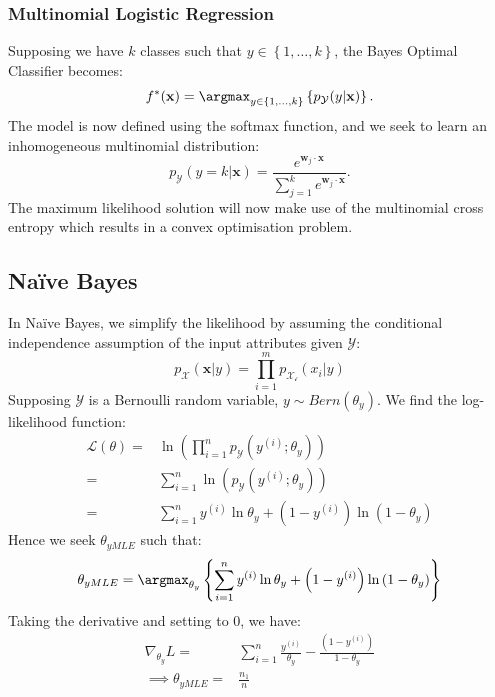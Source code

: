\subsubsection{Multinomial Logistic Regression}
Supposing we have $k$ classes such that $y\in \left\{ 1,\ldots,k \right\}$, the Bayes
Optimal Classifier becomes:
\[f^{*}(\mathbf{x})=\argmax_{y\in \left\{ 1,\ldots,k \right\}}\left\{ p_\mathcal{Y}(y|\mathbf{x}) \right\}.\] 
The model is now defined using the softmax function, and we seek to learn an
inhomogeneous multinomial distribution:
\[p_\mathcal{Y}(y=k|\mathbf{x})=\frac{e^{\mathbf{w}_j\cdot \mathbf{x}}}{\sum_{j=1}^{k} e^{\mathbf{w}_j\cdot\mathbf{x}}}.\] 
The maximum likelihood solution will now make use of the multinomial cross
entropy which results in a convex optimisation problem.

\subsection{Naïve Bayes}
In Naïve Bayes, we simplify the likelihood by assuming the conditional
independence assumption of the input attributes given $\mathcal{Y}$:
\[p_\mathcal{X}(\mathbf{x}|y)=\prod_{i=1}^{m} p_\mathcal{X_i} (x_i|y)\] 
Supposing $\mathcal{Y}$ is a Bernoulli random variable,
$y\sim Bern(\theta_y)$. We find the log-likelihood function:
\begin{align*}
\mathcal{L}\left( \theta \right) =& \ln\left( \prod_{i=1}^{n} p_\mathcal{Y}\left( y^{(i)};\theta_y \right) \right)\\
=&\sum_{i=1}^{n} \ln\left( p_\mathcal{Y}\left( y^{(i)};\theta_y \right)  \right)\\
=&\sum_{i=1}^{n} y^{(i)}\ln\theta_y+\left(1-y^{(i)}\right)\ln\left( 1-\theta_y \right) 
\end{align*}
Hence we seek $\theta_{yMLE}$ such that:
\[\theta_{yMLE}=\argmax_{\theta_y}\left\{ \sum_{i=1}^{n} y^{(i)}\ln\theta_y+\left(1-y^{(i)}\right)\ln\left( 1-\theta_y \right) \right\}\] 
Taking the derivative and setting to 0, we have:
\begin{align*}
\nabla_{\theta_y}L=&\sum_{i=1}^{n} \frac{y^{(i)}}{\theta_y}-\frac{(1-y^{(i)})}{1-\theta_y}\\
\implies\theta_{yMLE}=&\frac{n_1}{n}
\end{align*}
